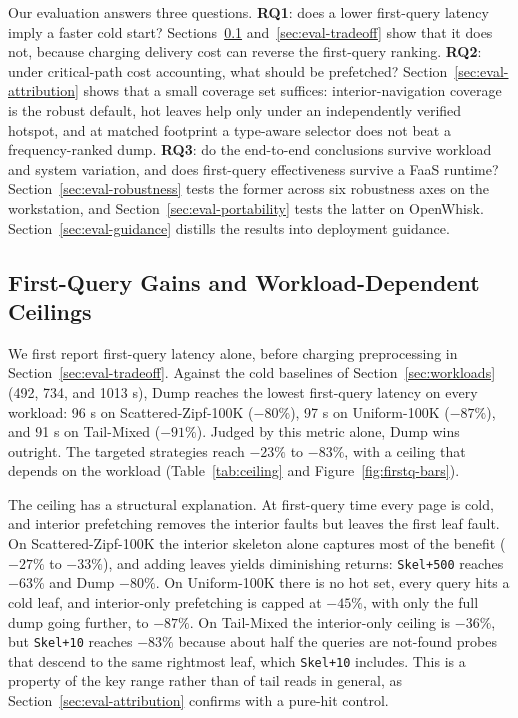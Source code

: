 \documentclass[sigconf, nonacm]{acmart}
\begin{document}
Our evaluation answers three questions. \textbf{RQ1}: does a lower first-query latency imply a faster cold start? Sections~\ref{sec:eval-fq} and~\ref{sec:eval-tradeoff} show that it does not, because charging delivery cost can reverse the first-query ranking. \textbf{RQ2}: under critical-path cost accounting, what should be prefetched? Section~\ref{sec:eval-attribution} shows that a small coverage set suffices: interior-navigation coverage is the robust default, hot leaves help only under an independently verified hotspot, and at matched footprint a type-aware selector does not beat a frequency-ranked dump. \textbf{RQ3}: do the end-to-end conclusions survive workload and system variation, and does first-query effectiveness survive a FaaS runtime? Section~\ref{sec:eval-robustness} tests the former across six robustness axes on the workstation, and Section~\ref{sec:eval-portability} tests the latter on OpenWhisk. Section~\ref{sec:eval-guidance} distills the results into deployment guidance.

\subsection{First-Query Gains and Workload-Dependent Ceilings}\label{sec:eval-fq}

We first report first-query latency alone, before charging preprocessing in Section~\ref{sec:eval-tradeoff}. Against the cold baselines of Section~\ref{sec:workloads} (492, 734, and 1013 \textmu s), Dump reaches the lowest first-query latency on every workload: 96 \textmu s on Scattered-Zipf-100K ($-80\%$), 97 \textmu s on Uniform-100K ($-87\%$), and 91 \textmu s on Tail-Mixed ($-91\%$). Judged by this metric alone, Dump wins outright. The targeted strategies reach $-23\%$ to $-83\%$, with a ceiling that depends on the workload (Table~\ref{tab:ceiling} and Figure~\ref{fig:firstq-bars}).

The ceiling has a structural explanation. At first-query time every page is cold, and interior prefetching removes the interior faults but leaves the first leaf fault. On Scattered-Zipf-100K the interior skeleton alone captures most of the benefit ($-27\%$ to $-33\%$), and adding leaves yields diminishing returns: \texttt{Skel+500} reaches $-63\%$ and Dump $-80\%$. On Uniform-100K there is no hot set, every query hits a cold leaf, and interior-only prefetching is capped at $-45\%$, with only the full dump going further, to $-87\%$. On Tail-Mixed the interior-only ceiling is $-36\%$, but \texttt{Skel+10} reaches $-83\%$ because about half the queries are not-found probes that descend to the same rightmost leaf, which \texttt{Skel+10} includes. This is a property of the key range rather than of tail reads in general, as Section~\ref{sec:eval-attribution} confirms with a pure-hit control.
\end{document}
